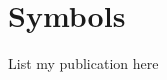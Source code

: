 \documentclass[phd, print]{nuthesis}
\begin{document}
\chapter{Symbols}

\begin{onehalfspacing}


\end{onehalfspacing}

\newpage
\begin{listofpub}
  List my publication here
\end{listofpub}

\end{document}
